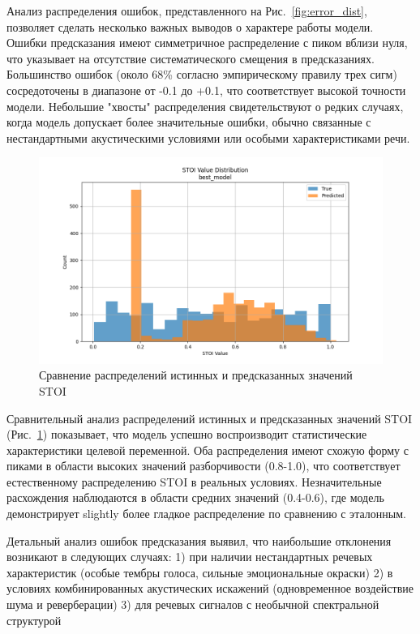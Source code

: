 \documentclass[oneside, final, 14pt]{extarticle}
\begin{document}
Анализ распределения ошибок, представленного на Рис.~\ref{fig:error_dist}, позволяет сделать несколько важных выводов о характере работы модели. Ошибки предсказания имеют симметричное распределение с пиком вблизи нуля, что указывает на отсутствие систематического смещения в предсказаниях. Большинство ошибок (около 68\% согласно эмпирическому правилу трех сигм) сосредоточены в диапазоне от -0.1 до +0.1, что соответствует высокой точности модели. Небольшие "хвосты" распределения свидетельствуют о редких случаях, когда модель допускает более значительные ошибки, обычно связанные с нестандартными акустическими условиями или особыми характеристиками речи.

\begin{figure}[]
\centering
\includegraphics[width=0.85\linewidth]{best_model_stoi_dist.png}
\caption{Сравнение распределений истинных и предсказанных значений STOI}
\label{fig:stoi_dist}
\end{figure}

Сравнительный анализ распределений истинных и предсказанных значений STOI (Рис.~\ref{fig:stoi_dist}) показывает, что модель успешно воспроизводит статистические характеристики целевой переменной. Оба распределения имеют схожую форму с пиками в области высоких значений разборчивости (0.8-1.0), что соответствует естественному распределению STOI в реальных условиях. Незначительные расхождения наблюдаются в области средних значений (0.4-0.6), где модель демонстрирует slightly более гладкое распределение по сравнению с эталонным.

Детальный анализ ошибок предсказания выявил, что наибольшие отклонения возникают в следующих случаях:
1) при наличии нестандартных речевых характеристик (особые тембры голоса, сильные эмоциональные окраски)
2) в условиях комбинированных акустических искажений (одновременное воздействие шума и реверберации)
3) для речевых сигналов с необычной спектральной структурой
\end{document}

